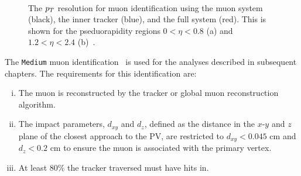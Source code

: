 \begin{figure}[t]
\centering
     \\
\caption{The $p_{T}$ resolution for muon identification using the muon system (black), the inner tracker (blue), and the full system (red). This is shown for the pseduorapidity regions $0 < \eta < 0.8$ (a) and  $1.2 < \eta < 2.4$ (b)~\cite{CMS_Setup}.}
\label{fig:muon_eff}
\end{figure}

The \texttt{Medium} muon identification~\cite{CMS:2018rym} is used for the analyses described in subsequent chapters.
The requirements for this identification are:
\begin{enumerate}[i)]
\item The muon is reconstructed by the tracker or global muon reconstruction algorithm.
\item The impact parameters, $d_{xy}$ and $d_{z}$, defined as the distance in the $x$-$y$ and $z$ plane of the closest approach to the \ac{PV}, are restricted to $d_{xy}<0.045$ cm and $d_{z}<0.2$ cm to ensure the muon is associated with the primary vertex.
\item At least 80\% the tracker traversed must have hits in.
\end{enumerate}

